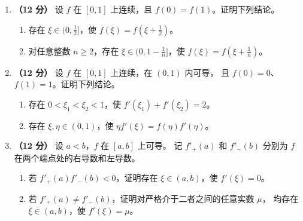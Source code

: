 \documentclass[UTF8,a4paper,zihao=-4,fontset=fandol]{ctexart}
\begin{document}
\newpage
\begin{enumerate}[start=20]
  \item \textbf{（12 分）} 设 $f$ 在 $[0,1]$ 上连续，且 $f(0)=f(1)$。证明下列结论。
  \begin{enumerate}
    \item 存在 $\xi\in(0,\tfrac12]$，使 $f(\xi)=f(\xi+\tfrac12)$。
    \item 对任意整数 $n\ge2$，存在 $\xi\in(0,1-\tfrac1n]$，使 $f(\xi)=f(\xi+\tfrac1n)$。
  \end{enumerate}
  \vspace{6cm}

  \item \textbf{（12 分）} 设 $f$ 在 $[0,1]$ 上连续，在 $(0,1)$ 内可导，
  且 $f(0)=0$、$f(1)=1$。证明下列结论。
  \begin{enumerate}
    \item 存在 $0<\xi_1<\xi_2<1$，使 $f'(\xi_1)+f'(\xi_2)=2$。
    \item 存在 $\xi,\eta\in(0,1)$，使 $\eta f'(\xi)=f(\eta)f'(\eta)$。
  \end{enumerate}
  \vspace{6cm}

  \item \textbf{（12 分）} 设 $a<b$，$f$ 在 $[a,b]$ 上可导。
  记 $f'_+(a)$ 和 $f'_-(b)$ 分别为 $f$ 在两个端点处的右导数和左导数。
  \begin{enumerate}
    \item 若 $f'_+(a)f'_-(b)<0$，证明存在 $\xi\in(a,b)$，使 $f'(\xi)=0$。
    \item 若 $f'_+(a)\ne f'_-(b)$，证明对严格介于二者之间的任意实数 $\mu$，
    均存在 $\xi\in(a,b)$，使 $f'(\xi)=\mu$。
  \end{enumerate}
\end{enumerate}
\end{document}
